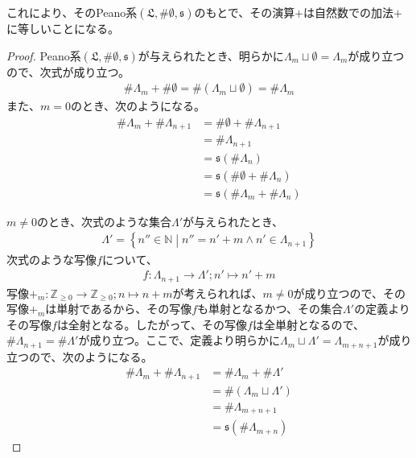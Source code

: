 \documentclass[dvipdfmx]{jsarticle}
\begin{document}
これにより、そのPeano系$\left( \mathfrak{L,}\# \emptyset ,\mathfrak{s} \right)$のもとで、その演算$+$は自然数での加法$+$に等しいことになる。
\begin{proof}
Peano系$\left( \mathfrak{L,}\# \emptyset ,\mathfrak{s} \right)$が与えられたとき、明らかに$\varLambda_{m} \sqcup \emptyset  = \varLambda_{m}$が成り立つので、次式が成り立つ。
\begin{align*}
\# \varLambda_{m} + \# \emptyset  = \# \left( \varLambda_{m} \sqcup \emptyset  \right) = \# \varLambda_{m}
\end{align*}
また、$m = 0$のとき、次のようになる。
\begin{align*}
\# \varLambda_{m} + \# \varLambda_{n + 1} &= \# \emptyset  + \# \varLambda_{n + 1}\\
&= \# \varLambda_{n + 1}\\
& = \mathfrak{s}\left( \# \varLambda_{n} \right)\\
& = \mathfrak{s}\left( \# \emptyset  + \# \varLambda_{n} \right)\\
& = \mathfrak{s}\left( \# \varLambda_{m} + \# \varLambda_{n} \right)
\end{align*}\par
$m \neq 0$のとき、次式のような集合$\varLambda'$が与えられたとき、
\begin{align*}
\varLambda' = \left\{ n'' \in \mathbb{N} \middle| n'' = n' + m \land n' \in \varLambda_{n + 1} \right\}
\end{align*}
次式のような写像$f$について、
\begin{align*}
f:\varLambda_{n + 1} \rightarrow \varLambda';n' \mapsto n' + m
\end{align*}
写像$+_{m}:\mathbb{Z}_{\geq 0} \rightarrow \mathbb{Z}_{\geq 0};n \mapsto n + m$が考えられれば、$m \neq 0$が成り立つので、その写像$+_{m}$は単射であるから、その写像$f$も単射となるかつ、その集合$\varLambda'$の定義よりその写像$f$は全射となる。したがって、その写像$f$は全単射となるので、$\# \varLambda_{n + 1} = \# \varLambda'$が成り立つ。ここで、定義より明らかに$\varLambda_{m} \sqcup \varLambda' = \varLambda_{m + n + 1}$が成り立つので、次のようになる。
\begin{align*}
\# \varLambda_{m} + \# \varLambda_{n + 1} &= \# \varLambda_{m} + \# \varLambda'\\
&= \# \left( \varLambda_{m} \sqcup \varLambda' \right)\\
&= \# \varLambda_{m + n + 1}\\
& = \mathfrak{s}\left( \# \varLambda_{m + n} \right)
\end{align*}

\end{proof}
\end{document}
